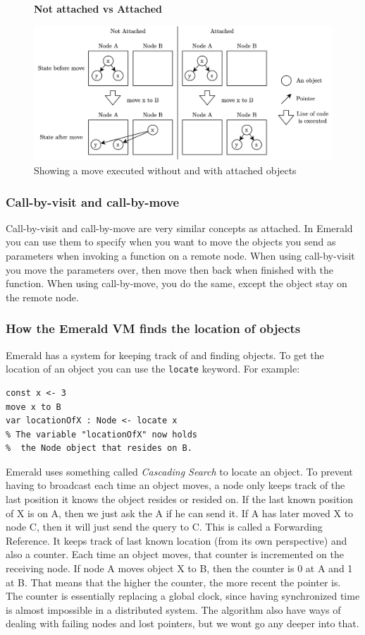 \begin{figure}[t]
    \centering
    \textbf{Not attached vs Attached}\par\medskip
    \includegraphics[scale=0.8]{chapters/background/figures/emerald_attached.png}
    \caption{Showing a move executed without and with attached objects}
    \label{fig:emerald_attached_figure}
\end{figure}

\subsubsection{Call-by-visit and call-by-move}
Call-by-visit and call-by-move are very similar concepts as attached. In Emerald you can use them to specify when you want to move the objects you send as parameters when invoking a function on a remote node. When using call-by-visit you move the parameters over, then move then back when finished with the function. When using call-by-move, you do the same, except the object stay on the remote node.

\subsubsection{How the Emerald VM finds the location of objects}\label{cascading_search}
Emerald has a system for keeping track of and finding objects. To get the location of an object you can use the \verb|locate| keyword. For example:
\begin{lstlisting}[language=emerald]
const x <- 3
move x to B
var locationOfX : Node <- locate x
% The variable "locationOfX" now holds 
%  the Node object that resides on B.
\end{lstlisting}
Emerald uses something called \textit{Cascading Search} to locate an object. To prevent having to broadcast each time an object moves, a node only keeps track of the last position it knows the object resides or resided on. If the last known position of X is on A, then we just ask the A if he can send it. If A has later moved X to node C, then it will just send the query to C. This is called a Forwarding Reference. It keeps track of last known location (from its own perspective) and also a counter. Each time an object moves, that counter is incremented on the receiving node. If node A moves object X to B, then the counter is 0 at A and 1 at B. That means that the higher the counter, the more recent the pointer is. The counter is essentially replacing a global clock, since having synchronized time is almost impossible in a distributed system. The algorithm also have ways of dealing with failing nodes and lost pointers, but we wont go any deeper into that. 


